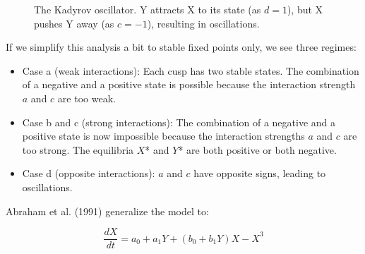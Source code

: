 \documentclass[
  a4paper,
  DIV=11,
  numbers=noendperiod,
  oneside]{scrreprt}
\begin{document}
\begin{figure}


\caption{\label{fig-ch4n-img17-old-65}The Kadyrov oscillator. Y attracts
X to its state (as \(d = 1\)), but X pushes Y away (as \(c = - 1\)),
resulting in oscillations.}

\end{figure}%

If we simplify this analysis a bit to stable fixed points only, we see
three regimes:

\begin{itemize}
\item
  Case a (weak interactions): Each cusp has two stable states. The
  combination of a negative and a positive state is possible because the
  interaction strength \(a\) and \(c\) are too weak.
\item
  Case b and c (strong interactions): The combination of a negative and
  a positive state is now impossible because the interaction strengths
  \(a\) and \(c\) are too strong. The equilibria \(X\)* and \(Y\)* are
  both positive or both negative.
\item
  Case d (opposite interactions): \(a\) and \(c\) have opposite signs,
  leading to oscillations.
\end{itemize}

Abraham et al. (1991) generalize the model to:

\[\frac{dX}{dt} = {a_{0} + a_{1}Y + (b_{0} + b_{1}Y)X - X}^{3}\]
\end{document}
